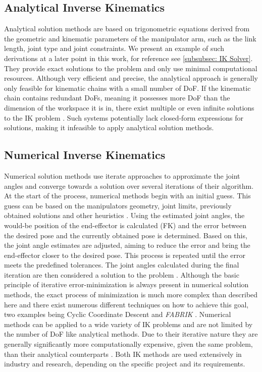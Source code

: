 \subsection{Analytical Inverse Kinematics}
Analytical solution methods are based on trigonometric equations derived from the geometric and kinematic parameters of the manipulator arm, such as the link length, joint type and joint constraints.
We present an example of such derivations at a later point in this work, for reference see \ref{subsubsec: IK Solver}.
They provide exact solutions to the problem and only use minimal computational resources.
Although very efficient and precise, the analytical approach is generally only feasible for kinematic chains with a small number of DoF.
If the kinematic chain contains redundant DoFs, meaning it possesses more DoF than the dimension of the workspace it is in, there exist multiple or even infinite solutions to the IK problem \parencite{inverseKinematicsIllinois}.
Such systems potentially lack closed-form expressions for solutions, making it infeasible to apply analytical solution methods.

\subsection{Numerical Inverse Kinematics}
Numerical solution methods use iterate approaches to approximate the joint angles and converge towards a solution over several iterations of their algorithm.
At the start of the process, numerical methods begin with an initial guess.
This guess can be based on the manipulators geometry, joint limits, previously obtained solutions and other heuristics \parencite{inverseKinematicsIllinois}.
Using the estimated joint angles, the would-be position of the end-effector is calculated (FK) and the error between the desired pose and the currently obtained pose is determined.
Based on this, the joint angle estimates are adjusted, aiming to reduce the error and bring the end-effector closer to the desired pose.
This process is repeated until the error meets the predefined tolerances.
The joint angles calculated during the final iteration are then considered a solution to the problem \parencite{inverseKinematicsIllinois}.
Although the basic principle of iterative error-minimization is always present in numerical solution methods, the exact process of minimization is much more complex than described here and there exist numerous different techniques on how to achieve this goal, two examples being Cyclic Coordinate Descent \parencite{inverseKinematicsIllinois} and \textit{FABRIK} \parencite{AristidouFABRIK}. 
Numerical methods can be applied to a wide variety of IK problems and are not limited by the number of DoF like analytical methods.
Due to their iterative nature they are generally significantly more computationally expensive, given the same problem, than their analytical counterparts \parencite{aristidou2018inverse}.
Both IK methods are used extensively in industry and research, depending on the specific project and its requirements.


